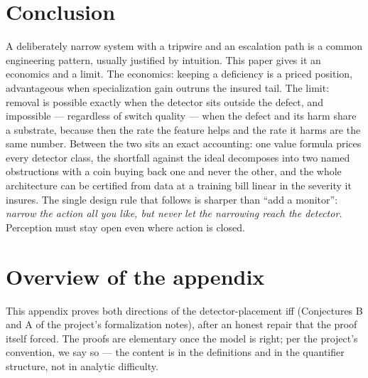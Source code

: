 \documentclass[11pt]{article}
\theoremstyle{plain}
\theoremstyle{definition}
\begin{document}
\section{Conclusion}\label{sec:conclusion}

A deliberately narrow system with a tripwire and an escalation path is a
common engineering pattern, usually justified by intuition. This paper gives
it an economics and a limit. The economics: keeping a deficiency is a priced
position, advantageous when specialization gain outruns the insured tail. The
limit: removal is possible exactly when the detector sits outside the defect,
and impossible --- regardless of switch quality --- when the defect and its harm
share a substrate, because then the rate the feature helps and the rate it
harms are the same number. Between the two sits an exact accounting: one
value formula prices every detector class, the shortfall against the ideal
decomposes into two named obstructions with a coin buying back one and never
the other, and the whole architecture can be certified from data at a
training bill linear in the severity it insures. The single design rule that
follows is sharper than
``add a monitor'': \emph{narrow the action all you like, but never let the narrowing
reach the detector.} Perception must stay open even where action is closed.

\appendix

\section*{Overview of the appendix}

This appendix proves both directions of the detector-placement iff
(Conjectures B and A of the project's formalization notes), after an honest
repair that the proof itself forced. The proofs are elementary once the model
is right; per the project's convention, we say so --- the content is in the
definitions and in the quantifier structure, not in analytic difficulty.
\end{document}
